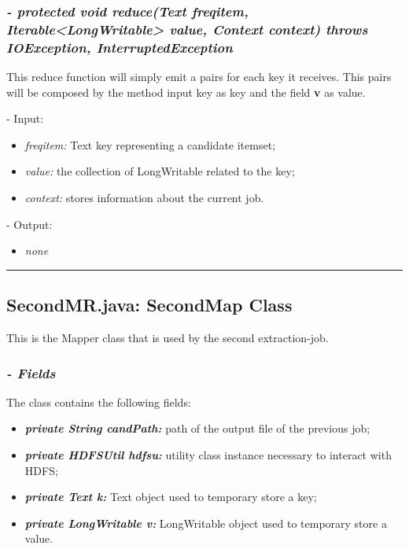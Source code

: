 \documentclass[]{report}
\begin{document}
	\subsubsection*{\textit{\textbf{-} protected void reduce(Text freqitem, Iterable<LongWritable> value, Context context) throws IOException, InterruptedException}}   	
	This reduce function will simply emit a pairs for each key it receives. This pairs will be composed by the method input key as key and the field \textbf{v} as value.    
	\begin{description}
		\item - Input:
		\begin{itemize}
			\item \textit{freqitem:} Text key representing a candidate itemset;
			\item \textit{value:} the collection of LongWritable related to the key;
			\item \textit{context:} stores information about the current job.
		\end{itemize}
	\end{description}	
	\begin{description}
		\item - Output:
		\begin{itemize}
			\item \textit{none} 
		\end{itemize}
	\end{description}

	\rule{\textwidth}{0.4pt}	
	
	\subsection*{SecondMR.java: SecondMap Class}
	This is the Mapper class that is used by the second extraction-job.
	\subsubsection*{\textit{\textbf{-} Fields}} 
	The class contains the following fields:
	\begin{itemize}
		\item \textit{\textbf{private String candPath:}} path of the output file of the previous job;
		\item \textit{\textbf{private HDFSUtil hdfsu:}} utility class instance necessary to interact with HDFS;
		\item \textit{\textbf{private Text k:}} Text object used to temporary store a key; 
		\item \textit{\textbf{private LongWritable v:}} LongWritable object used to temporary store a value.	
	\end{itemize}
	
\end{document}
